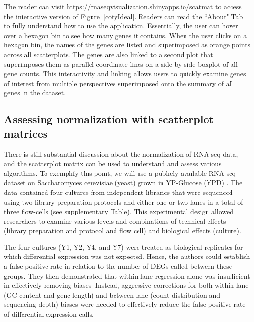 \documentclass{bioinfo}
\begin{document}
The reader can visit https://rnaseqvisualization.shinyapps.io/scatmat to access the interactive version of Figure~\ref{cotyIdeal}. Readers can read the ``About" Tab to fully understand how to use the application. Essentially, the user can hover over a hexagon bin to see how many genes it contains. When the user clicks on a hexagon bin, the names of the genes are listed and superimposed as orange points across all scatterplots. The genes are also linked to a second plot that superimposes them as parallel coordinate lines on a side-by-side boxplot of all gene counts. This interactivity and linking allows users to quickly examine genes of interest from multiple perspectives superimposed onto the summary of all genes in the dataset. 

\subsection{Assessing normalization with scatterplot matrices}

There is still substantial discussion about the normalization of RNA-seq data, and the scatterplot matrix can be used to understand and assess various algorithms. To exemplify this point, we will use a publicly-available RNA-seq dataset on Saccharomyces cerevisiae (yeast) grown in YP-Glucose (YPD) \citep{Risso}. The data contained four cultures from independent libraries that were sequenced using two library preparation protocols and either one or two lanes in a total of three flow-cells (see supplementary Table). This experimental design allowed researchers to examine various levels and combinations of technical effects (library preparation and protocol and flow cell) and biological effects (culture).

The four cultures (Y1, Y2, Y4, and Y7) were treated as biological replicates for which differential expression was not expected. Hence, the authors could establish a false positive rate in relation to the number of DEGs called between these groups. They then demonstrated that within-lane regression alone was insufficient in effectively removing biases. Instead, aggressive corrections for both within-lane (GC-content and gene length) and between-lane (count distribution and sequencing depth) biases were needed to effectively reduce the false-positive rate of differential expression calls.
\end{document}
